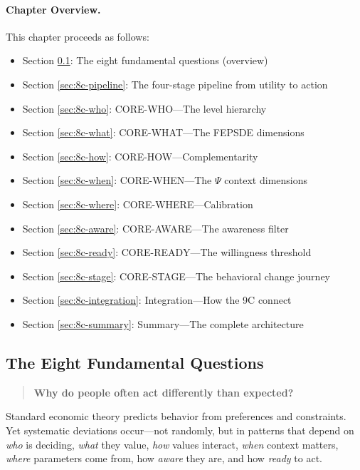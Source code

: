 \paragraph{Chapter Overview.}
\label{sec:8c-overview}
This chapter proceeds as follows:
\begin{itemize}
    \item Section \ref{sec:8c-questions}: The eight fundamental questions (overview)
    \item Section \ref{sec:8c-pipeline}: The four-stage pipeline from utility to action
    \item Section \ref{sec:8c-who}: CORE-WHO---The level hierarchy
    \item Section \ref{sec:8c-what}: CORE-WHAT---The FEPSDE dimensions
    \item Section \ref{sec:8c-how}: CORE-HOW---Complementarity
    \item Section \ref{sec:8c-when}: CORE-WHEN---The $\Psi$ context dimensions
    \item Section \ref{sec:8c-where}: CORE-WHERE---Calibration
    \item Section \ref{sec:8c-aware}: CORE-AWARE---The awareness filter
    \item Section \ref{sec:8c-ready}: CORE-READY---The willingness threshold
    \item Section \ref{sec:8c-stage}: CORE-STAGE---The behavioral change journey
    \item Section \ref{sec:8c-integration}: Integration---How the 9C connect
    \item Section \ref{sec:8c-summary}: Summary---The complete architecture
\end{itemize}

\subsection{The Eight Fundamental Questions}
\label{sec:8c-questions}

\begin{quote}
\textbf{Why do people often act differently than expected?}
\end{quote}

Standard economic theory predicts behavior from preferences and constraints.
Yet systematic deviations occur---not randomly, but in patterns that depend on
\emph{who} is deciding, \emph{what} they value, \emph{how} values interact,
\emph{when} context matters, \emph{where} parameters come from, how \emph{aware}
they are, and how \emph{ready} to act.

